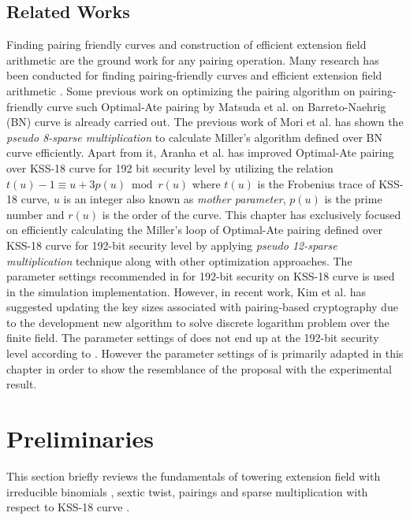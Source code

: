 \subsection{Related Works}
\label{sec:ch:icisc:related_works}
Finding pairing friendly curves \cite{EPRINT:FreScoTes06} and construction of efficient extension field arithmetic are the ground work for any pairing operation.
Many research has been conducted for finding pairing-friendly curves \cite{SCN:BarLynSco02, JC:DupEngMor05} and efficient extension field arithmetic \cite{JC:BaiPaa01}.
Some previous work on optimizing the pairing algorithm on pairing-friendly curve such Optimal-Ate pairing by Matsuda et al. \cite{EPRINT:MKHO07} on Barreto-Naehrig (BN) curve \cite{SAC:BarNae05} is already carried out.
The previous work of Mori et al. \cite{PAIRING:MANS13} has shown the \textit{pseudo 8-sparse multiplication} to calculate Miller's algorithm defined over BN curve efficiently. Apart from it, Aranha et al. \cite{PAIRING:AFKMR12} has improved Optimal-Ate pairing over KSS-18 curve for 192 bit security level by utilizing the relation $t(u) - 1 \equiv u + 3p(u) \bmod r(u)$ where $t(u)$ is the Frobenius trace of KSS-18 curve, $u$ is an integer also known as \textit{mother parameter}, $p(u)$ is the prime number and $r(u)$ is the order of the curve. This chapter has exclusively focused on efficiently calculating the Miller's loop of Optimal-Ate pairing defined over KSS-18 curve \cite{EPRINT:KacSchSco07} for 192-bit security level by applying\textit{ pseudo 12-sparse multiplication} technique along with other optimization approaches. The parameter settings recommended in \cite{PAIRING:AFKMR12} for 192-bit security on KSS-18 curve is used in the simulation implementation. However, in recent work, Kim et al. \cite{C:KimBar16} has suggested updating the key sizes associated with pairing-based cryptography due to the development new algorithm to solve discrete logarithm problem over the finite field. The parameter settings of \cite{PAIRING:AFKMR12} does not end up at the 192-bit security level according to \cite{C:KimBar16}. However the parameter settings of \cite{PAIRING:AFKMR12}  is primarily adapted in this chapter in order to show the resemblance of the proposal with the experimental result.

\section{Preliminaries}
\label{sec:ch:icisc:preliminaries}
This section briefly reviews the fundamentals of towering extension field with irreducible binomials \cite{JC:BaiPaa01}, sextic twist, pairings and sparse multiplication \cite{PAIRING:MANS13} with respect to KSS-18 curve \cite{EPRINT:KacSchSco07}.
